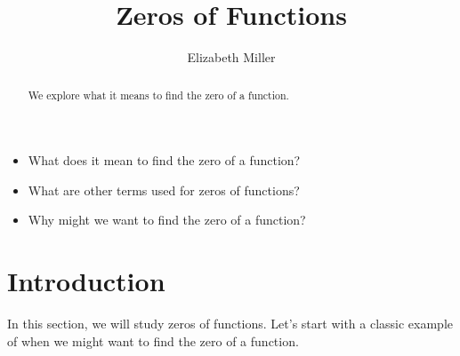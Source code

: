 \documentclass[nooutcomes]{ximera}
\author{Elizabeth Miller}
\title{Zeros of Functions}
\begin{document}
\begin{abstract}
 We explore what it means to find the zero of a function.
\end{abstract}
\maketitle



\begin{motivatingQuestions}\begin{itemize}
\item What does it mean to find the zero of a function?
\item What are other terms used for zeros of functions?
\item Why might we want to find the zero of a function?
\end{itemize}\end{motivatingQuestions}



\section{Introduction}
In this section, we will study zeros of functions. Let's start with a classic example of when we might want to find the zero of a function.  
\end{document}

